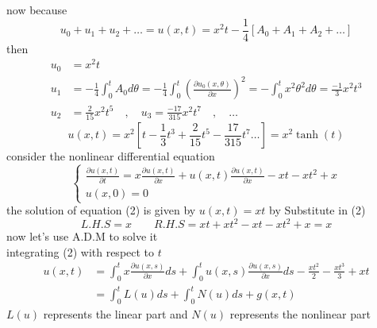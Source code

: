 \documentclass[]{article}
\begin{document}
now because 
\[
u_0 + u_1 + u_2 +\dots = u(x,t) = x^2t - \frac{1}{4}[A_0+A_1+A_2+\dots]
\]
then 
\begin{align*}
    u_0 &= x^2t  
    \\
    u_1 &= -\frac{1}{4}\int_{0}^{t}A_0d\theta = -\frac{1}{4}\int_{0}^{t}\left(\frac{\partial u_0(x,\theta)}{\partial x}\right)^2 = -\int_{0}^{t} x^2 \theta^2 d\theta = \frac{-1}{3}x^2t^3
    \\
    u_2 &= \frac{2}{15} x^2t^5
    \quad , \quad
    u_3 = \frac{-17}{315} x^2t^7 \quad , \quad \dots
\end{align*}
\[
    u(x,t) = x^2 \left[t-\frac{1}{3}t^3 + \frac{2}{15} t^5 - \frac{17}{315} t^7 \dots\right] = x^2 \tanh(t)
\]
consider the nonlinear differential equation 
\begin{equation}
    \begin{cases}
         \displaystyle \frac{\partial u(x,t)}{\partial t} = x\frac{\partial u(x,t)}{\partial x} +u(x,t)\frac{\partial u(x,t)}{\partial x} -xt -xt^2 +x
         \\
         \displaystyle u(x,0) = 0
     \end{cases}
 \end{equation}
the solution of equation (2) is given by $u(x,t)=xt$ by Substitute in (2)
\[
L.H.S = x
\qquad
R.H.S = xt + xt^2 -xt -xt^2 +x = x
\]
now let's use A.D.M to solve it 
\\
integrating (2) with respect to $t$
\begin{align*}
    u(x,t) &= \int_{0}^{t}x\frac{\partial u(x,s)}{\partial x}ds + \int_{0}^{t}u(x,s)\frac{\partial u(x,s)}{\partial x}ds - \frac{xt^2}{2} - \frac{xt^3}{3} + xt
    \\
    &= \int_{0}^{t} L(u)ds + \int_{0}^{t} N(u)ds + g(x,t)
\end{align*}
$L(u)$ represents the linear part and $N(u)$ represents the nonlinear part
\end{document}
